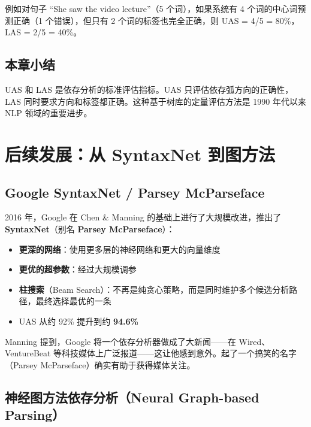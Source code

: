 \documentclass[a4paper]{article}
\begin{document}
例如对句子 ``She saw the video lecture''（5 个词），如果系统有 4 个词的中心词预测正确（1 个错误），但只有 2 个词的标签也完全正确，则 UAS = 4/5 = 80\%，LAS = 2/5 = 40\%。

\subsection{本章小结}

UAS 和 LAS 是依存分析的标准评估指标。UAS 只评估依存弧方向的正确性，LAS 同时要求方向和标签都正确。这种基于树库的定量评估方法是 1990 年代以来 NLP 领域的重要进步。


\section{后续发展：从 SyntaxNet 到图方法}

\subsection{Google SyntaxNet / Parsey McParseface}





2016 年，Google 在 Chen \& Manning 的基础上进行了大规模改进，推出了 \textbf{SyntaxNet}（别名 \textbf{Parsey McParseface}）：

\begin{itemize}
    \item \textbf{更深的网络}：使用更多层的神经网络和更大的向量维度
    \item \textbf{更优的超参数}：经过大规模调参
    \item \textbf{柱搜索}（Beam Search）：不再是纯贪心策略，而是同时维护多个候选分析路径，最终选择最优的一条
    \item UAS 从约 92\% 提升到约 \textbf{94.6\%}
\end{itemize}

Manning 提到，Google 将一个依存分析器做成了大新闻——在 Wired、VentureBeat 等科技媒体上广泛报道——这让他感到意外。起了一个搞笑的名字（Parsey McParseface）确实有助于获得媒体关注。

\subsection{神经图方法依存分析（Neural Graph-based Parsing）}


\end{document}
